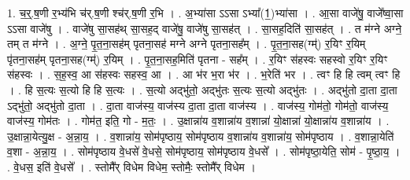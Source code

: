\documentclass[17pt]{extarticle}
\begin{document}
1. च॒र्॒.ष॒णी र॒भ्य॑भि च॑र्.ष॒णी श्च॑र्.ष॒णी र॒भि । . अ॒भ्या॑सा ऽऽसा ऽभ्या᳚(1॒)भ्या॑सा । . आ॒सा वाजे॑षु॒ वाजे᳚ष्वा॒सा ऽऽसा वाजे॑षु । . वाजे॑षु सा॒सह॑थ् सा॒सह॒द् वाजे॑षु॒ वाजे॑षु सा॒सह॑त् । . सा॒सह॒दिति॑ सा॒सह॑त् । . त म॑ग्ने अग्ने॒ तम् त म॑ग्ने । . अ॒ग्ने॒ पृ॒त॒ना॒सह॑म् पृतना॒सह॑ मग्ने अग्ने पृतना॒सह᳚म् । . पृ॒त॒ना॒सह(ग्म्॑) र॒यिꣳ र॒यिम् पृ॑तना॒सह॑म् पृतना॒सह(ग्म्॑) र॒यिम् । . पृ॒त॒ना॒सह॒मिति॑ पृतना - सह᳚म् । . र॒यिꣳ स॑हस्वः सहस्वो र॒यिꣳ र॒यिꣳ स॑हस्वः । . स॒ह॒स्व॒ आ स॑हस्वः सहस्व॒ आ । . आ भ॑र भ॒रा भ॑र । . भ॒रेति॑ भर । . त्वꣳ हि हि त्वम् त्वꣳ हि । . हि स॒त्यः स॒त्यो हि हि स॒त्यः । . स॒त्यो अद्भु॑तो॒ अद्भु॑तः स॒त्यः स॒त्यो अद्भु॑तः । . अद्भु॑तो दा॒ता दा॒ता ऽद्भु॑तो॒ अद्भु॑तो दा॒ता । . दा॒ता वाज॑स्य॒ वाज॑स्य दा॒ता दा॒ता वाज॑स्य । . वाज॑स्य॒ गोम॑तो॒ गोम॑तो॒ वाज॑स्य॒ वाज॑स्य॒ गोम॑तः । . गोम॑त॒ इति॒ गो - म॒तः॒ । . उ॒क्षान्ना॑य व॒शान्ना॑य व॒शान्ना॑ यो॒क्षान्ना॑ यो॒क्षान्ना॑य व॒शान्ना॑य । . उ॒क्षान्ना॒येत्यु॒क्ष - अ॒न्ना॒य॒ । . व॒शान्ना॑य॒ सोम॑पृष्ठाय॒ सोम॑पृष्ठाय व॒शान्ना॑य व॒शान्ना॑य॒ सोम॑पृष्ठाय । . व॒शान्ना॒येति॑ व॒शा - अ॒न्ना॒य॒ । . सोम॑पृष्ठाय वे॒धसे॑ वे॒धसे॒ सोम॑पृष्ठाय॒ सोम॑पृष्ठाय वे॒धसे᳚ । . सोम॑पृष्ठा॒येति॒ सोम॑ - पृ॒ष्ठा॒य॒ । . वे॒धस॒ इति॑ वे॒धसे᳚ । . स्तोमै᳚र् विधेम विधेम॒ स्तोमैः॒ स्तोमै᳚र् विधेम । \newline
\end{document}
